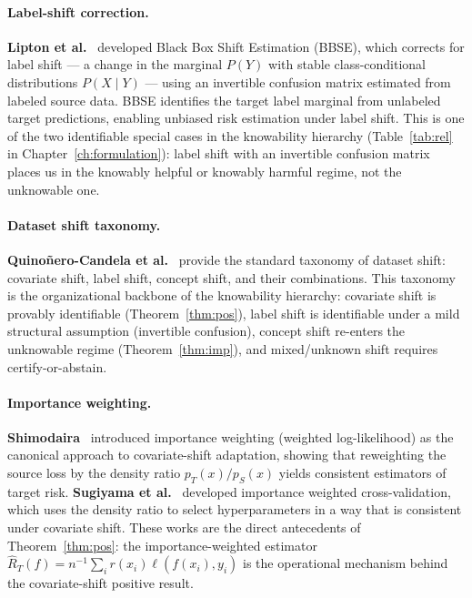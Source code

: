 \paragraph{Label-shift correction.}
\textbf{Lipton et al.}~\cite{lipton2018detecting} developed Black Box Shift
Estimation (BBSE), which corrects for label shift --- a change in the marginal
$P(Y)$ with stable class-conditional distributions $P(X \mid Y)$ --- using
an invertible confusion matrix estimated from labeled source data.
BBSE identifies the target label marginal from unlabeled target predictions,
enabling unbiased risk estimation under label shift.
This is one of the two identifiable special cases in the knowability hierarchy
(Table~\ref{tab:rel} in Chapter~\ref{ch:formulation}): label shift with an
invertible confusion matrix places us in the knowably helpful or knowably
harmful regime, not the unknowable one.

\paragraph{Dataset shift taxonomy.}
\textbf{Quino\~nero-Candela et al.}~\cite{quinonero2009dataset} provide the
standard taxonomy of dataset shift: covariate shift, label shift, concept
shift, and their combinations.
This taxonomy is the organizational backbone of the knowability hierarchy:
covariate shift is provably identifiable (Theorem~\ref{thm:pos}), label shift
is identifiable under a mild structural assumption (invertible confusion),
concept shift re-enters the unknowable regime (Theorem~\ref{thm:imp}), and
mixed/unknown shift requires certify-or-abstain.

\paragraph{Importance weighting.}
\textbf{Shimodaira}~\cite{shimodaira2000improving} introduced importance
weighting (weighted log-likelihood) as the canonical approach to covariate-shift
adaptation, showing that reweighting the source loss by the density ratio
$p_T(x)/p_S(x)$ yields consistent estimators of target risk.
\textbf{Sugiyama et al.}~\cite{sugiyama2007covariate} developed importance
weighted cross-validation, which uses the density ratio to select hyperparameters
in a way that is consistent under covariate shift.
These works are the direct antecedents of Theorem~\ref{thm:pos}: the
importance-weighted estimator $\widehat{R}_T(f) = n^{-1} \sum_i r(x_i)
\ell(f(x_i), y_i)$ is the operational mechanism behind the covariate-shift
positive result.

